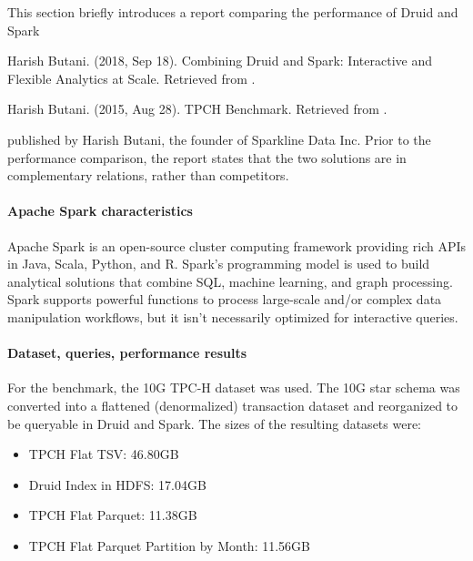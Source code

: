 \documentclass[letterpaper,10pt,english]{sphinxmanual}
\begin{document}
This section briefly introduces a report comparing the performance of Druid and Spark%
\begin{footnote}[4]\sphinxAtStartFootnote
Harish Butani. (2018, Sep 18). Combining Druid and Spark: Interactive and Flexible Analytics at Scale. Retrieved from .
%
\end{footnote}%
\begin{footnote}[5]\sphinxAtStartFootnote
Harish Butani. (2015, Aug 28). TPCH Benchmark. Retrieved from .
%
\end{footnote} published by Harish Butani, the founder of Sparkline Data Inc. Prior to the performance comparison, the report states that the two solutions are in complementary relations, rather than competitors.


\paragraph{Apache Spark characteristics}
\label{\detokenize{discovery/part01/druid_tests:id9}}
Apache Spark is an open-source cluster computing framework providing rich APIs in Java, Scala, Python, and R. Spark’s programming model is used to build analytical solutions that combine SQL, machine learning, and graph processing. Spark supports powerful functions to process large-scale and/or complex data manipulation workflows, but it isn’t necessarily optimized for interactive queries.


\paragraph{Dataset, queries, performance results}
\label{\detokenize{discovery/part01/druid_tests:id10}}
For the benchmark, the 10G TPC-H dataset was used. The 10G star schema was converted into a flattened (denormalized) transaction dataset and reorganized to be queryable in Druid and Spark. The sizes of the resulting datasets were:
\begin{itemize}
\item {} 
TPCH Flat TSV: 46.80GB

\item {} 
Druid Index in HDFS: 17.04GB

\item {} 
TPCH Flat Parquet: 11.38GB

\item {} 
TPCH Flat Parquet Partition by Month: 11.56GB

\end{itemize}
\end{document}
